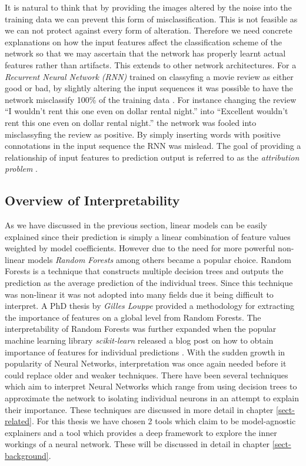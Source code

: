 It is natural to think that by providing the images altered by the noise into the training data we can prevent this form of misclassification. This is not feasible as we can not protect against every form of alteration. Therefore we need concrete explanations on how the input features affect the classification scheme of the network so that we may ascertain that the network has properly learnt actual features rather than artifacts. This extends to other network architectures. For a \emph{Recurrent Neural Network (RNN)} \cite{DBLP:journals/corr/Schmidhuber14} trained on classyfing a movie review as either good or bad, by slightly altering the input sequences it was possible to have the network misclassify 100\% of the training data \cite{DBLP:journals/corr/PapernotMSH16}. For instance changing the review “I  wouldn’t  rent  this  one  even  on  dollar  rental  night.”  into  “Excellent wouldn’t  rent  this  one  even  on  dollar  rental  night.” the network was fooled into misclassyfing the review as positive.  By simply inserting words with positive connotations in the input sequence the RNN was mislead. The goal of providing a relationship of input features to prediction output is referred to as the \emph{attribution problem} \cite{DBLP:journals/corr/SundararajanTY17}.

\subsection{Overview of Interpretability}
As we have discussed in the previous section, linear models can be easily explained since their prediction is simply a linear combination of feature values weighted by model coefficients. However due to the need for more powerful non-linear models \emph{Random Forests} \cite{inbookb} among others  became a popular choice. Random Forests is a technique that constructs multiple decision trees and outputs the prediction as the average prediction of the individual trees. Since this technique was non-linear it was not adopted into many fields due it being difficult to interpret. A PhD thesis by \emph{Gilles Louppe} \cite{louppe2015understanding}  provided a methodology for extracting the  importance of features on a global level from Random Forests. The interpretability of Random Forests was further expanded when the popular machine learning library \emph{scikit-learn} released a blog post on how to obtain importance of features for individual predictions \cite{RandomData}. With the sudden growth in popularity of Neural Networks, interpretation was once again needed before it could replace older and weaker techniques. There have been several techniques which aim to interpret Neural Networks which range from using decision trees to approximate the network to isolating individual neurons in an attempt to explain their importance. These techniques are discussed in more detail in chapter \ref{sect-related}. For this thesis we have chosen 2 tools which claim to be model-agnostic explainers and a tool which provides a deep framework to explore the inner workings of a neural network. These will be discussed in detail in chapter \ref{sect-background}.

